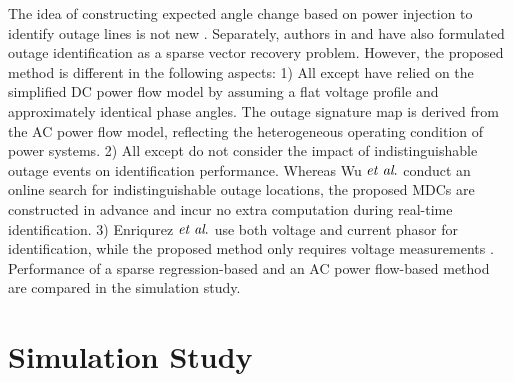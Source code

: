 The idea of constructing expected angle change based on power injection to identify outage lines is not new \cite{Tate2008,Wu2015,Costilla-Enriquez2019}. Separately, authors in \cite{Zhu2012} and \cite{Chen2014} have also formulated outage identification as a sparse vector recovery problem. However, the proposed method is different in the following aspects: 1) All except \cite{Costilla-Enriquez2019} have relied on the simplified DC power flow model by assuming a flat voltage profile and approximately identical phase angles. The outage signature map is derived from the AC power flow model, reflecting the heterogeneous operating condition of power systems. 2) All except \cite{Wu2015} do not consider the impact of indistinguishable outage events on identification performance. Whereas Wu $\textit{et al}.$ conduct an online search for indistinguishable outage locations, the proposed MDCs are constructed in advance and incur no extra computation during real-time identification. 3) Enriqurez $\textit{et al}.$ use both voltage and current phasor for identification, while the proposed method only requires voltage measurements \cite{Costilla-Enriquez2019}. Performance of a sparse regression-based \cite{Zhu2012} and an AC power flow-based method \cite{Costilla-Enriquez2019} are compared in the simulation study.



\section{Simulation Study}
\label{ch5:sec:simulation}


